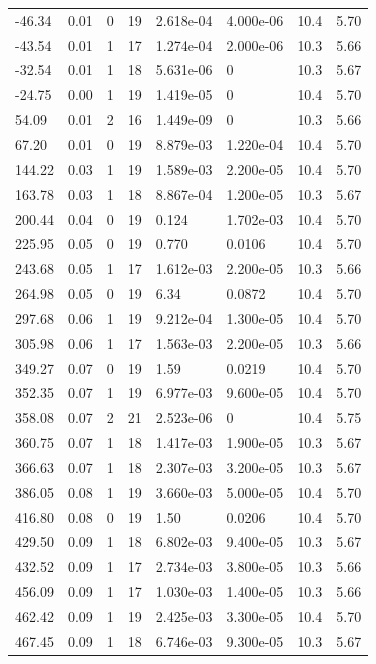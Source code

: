 \documentclass[preview]{standalone}
\begin{document}
{{\begin{tabular}{L{1.2cm}C{1.2cm} C{0.3cm}C{0.5cm} C{1.4cm}C{1.4cm} C{1.4cm}C{1.4cm}}
  -46.34  &  0.01  & 0     & 19 &  2.618e-04  & 4.000e-06  & 10.4 &  5.70   \\ 
  -43.54  &  0.01  & 1     & 17 &  1.274e-04  & 2.000e-06  & 10.3 &  5.66   \\ 
  -32.54  &  0.01  & 1     & 18 &  5.631e-06  & 0  & 10.3 &  5.67   \\ 
  -24.75  &  0.00  & 1     & 19 &  1.419e-05  & 0  & 10.4 &  5.70   \\ 
  54.09  &  0.01  & 2     & 16 &  1.449e-09  & 0  & 10.3 &  5.66   \\ 
  67.20  &  0.01  & 0     & 19 &  8.879e-03  & 1.220e-04  & 10.4 &  5.70   \\ 
  144.22  &  0.03  & 1     & 19 &  1.589e-03  & 2.200e-05  & 10.4 &  5.70   \\ 
  163.78  &  0.03  & 1     & 18 &  8.867e-04  & 1.200e-05  & 10.3 &  5.67   \\ 
  200.44  &  0.04  & 0     & 19 &  0.124  & 1.702e-03  & 10.4 &  5.70   \\ 
  225.95  &  0.05  & 0     & 19 &  0.770  & 0.0106  & 10.4 &  5.70   \\ 
  243.68  &  0.05  & 1     & 17 &  1.612e-03  & 2.200e-05  & 10.3 &  5.66   \\ 
  264.98  &  0.05  & 0     & 19 &  6.34  & 0.0872  & 10.4 &  5.70   \\ 
  297.68  &  0.06  & 1     & 19 &  9.212e-04  & 1.300e-05  & 10.4 &  5.70   \\ 
  305.98  &  0.06  & 1     & 17 &  1.563e-03  & 2.200e-05  & 10.3 &  5.66   \\ 
  349.27  &  0.07  & 0     & 19 &  1.59  & 0.0219  & 10.4 &  5.70   \\ 
  352.35  &  0.07  & 1     & 19 &  6.977e-03  & 9.600e-05  & 10.4 &  5.70   \\ 
  358.08  &  0.07  & 2     & 21 &  2.523e-06  & 0  & 10.4 &  5.75   \\ 
  360.75  &  0.07  & 1     & 18 &  1.417e-03  & 1.900e-05  & 10.3 &  5.67   \\ 
  366.63  &  0.07  & 1     & 18 &  2.307e-03  & 3.200e-05  & 10.3 &  5.67   \\ 
  386.05  &  0.08  & 1     & 19 &  3.660e-03  & 5.000e-05  & 10.4 &  5.70   \\ 
  416.80  &  0.08  & 0     & 19 &  1.50  & 0.0206  & 10.4 &  5.70   \\ 
  429.50  &  0.09  & 1     & 18 &  6.802e-03  & 9.400e-05  & 10.3 &  5.67   \\ 
  432.52  &  0.09  & 1     & 17 &  2.734e-03  & 3.800e-05  & 10.3 &  5.66   \\ 
  456.09  &  0.09  & 1     & 17 &  1.030e-03  & 1.400e-05  & 10.3 &  5.66   \\ 
  462.42  &  0.09  & 1     & 19 &  2.425e-03  & 3.300e-05  & 10.4 &  5.70   \\ 
  467.45  &  0.09  & 1     & 18 &  6.746e-03  & 9.300e-05  & 10.3 &  5.67   \\ 
\hline 
\end{tabular} 

}}
\end{document}

